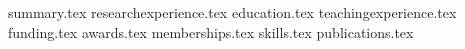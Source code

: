 \documentclass[12pt, a4paper]{awesome-cv}
\newcommand*{\sectiondir}{resume/}
\begin{document}
\makecvheader

{summary.tex}
{researchexperience.tex}
{education.tex}
{teachingexperience.tex}
{funding.tex}\vspace{-0.5cm}
{awards.tex}\vspace{-0.5cm}
{memberships.tex}
{skills.tex}
\newpage
{publications.tex}
\end{document}

